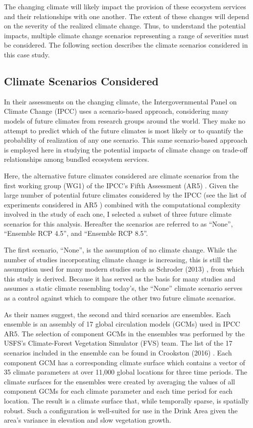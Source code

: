 The changing climate will likely impact the provision of these ecosystem services and their relationships with one another. The extent of these changes will depend on the severity of the realized climate change. Thus, to understand the potential impacts, multiple climate change scenarios representing a range of severities must be considered. The following section describes the climate scenarios considered in this case study.

\subsection{Climate Scenarios Considered}
In their assessments on the changing climate, the Intergovernmental Panel on Climate Change (IPCC) uses a scenario-based approach, considering many models of future climates from research groups around the world. They make no attempt to predict which of the future climates is most likely or to quantify the probability of realization of any one scenario. This same scenario-based approach is employed here in studying the potential impacts of climate change on trade-off relationships among bundled ecosystem services.

Here, the alternative future climates considered are climate scenarios from the first working group (WG1) of the IPCC's Fifth Assessment (AR5) \cite{ipcc2013climate}. Given the large number of potential future climates considered by the IPCC (see the list of experiments considered in AR5 \cite{ipccListOfAR5Models}) combined with the computational complexity involved in the study of each one, I selected a subset of three future climate scenarios for this analysis. Hereafter the scenarios are referred to as ``None'', ``Ensemble RCP 4.5'', and ``Ensemble RCP 8.5''.

The first scenario, ``None'', is the assumption of no climate change. While the number of studies incorporating climate change is increasing, this is still the assumption used for many modern studies such as Schroder (2013) \cite{schroder2016multi}, from which this study is derived. Because it has served as the basis for many studies and assumes a static climate resembling today's, the ``None'' climate scenario serves as a control against which to compare the other two future climate scenarios.

As their names suggest, the second and third scenarios are ensembles. Each ensemble is an assembly of 17 global circulation models (GCMs) used in IPCC AR5. The selection of component GCMs in the ensembles was performed by the USFS's Climate-Forest Vegetation Simulator (FVS) \cite{dixon2002essential} team. The list of the 17 scenarios included in the ensemble can be found in Crookston (2016) \cite{ClimateModelsInFVSEnsemble}. Each component GCM has a corresponding climate surface which contains a vector of 35 climate parameters at over 11,000 global locations for three time periods. The climate surfaces for the ensembles were created by averaging the values of all component GCMs for each climate parameter and each time period for each location. The result is a climate surface that, while temporally sparse, is spatially robust. Such a configuration is well-suited for use in the Drink Area given the area's variance in elevation and slow vegetation growth.

